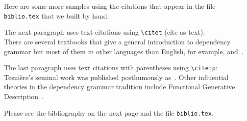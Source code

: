 Here are some more samples using the citations that appear in the file
\verb+biblio.tex+ that we built by hand.

The next paragraph uses text citations using \verb+\citet+ (cite as text):\\
\noindent
There are several textbooks that give a general 
introduction to dependency grammar but
most of them in other languages than English, for example,
\citet{tarvainen82} and~\citet{weber-97}.

The last paragraph uses text citations with parentheses
using \verb+\citetp+:\\
\noindent
Tesni{\`e}re's seminal work was published
posthumously as~\citep{tesniere59}. 
Other influential theories in the dependency
grammar tradition include Functional Generative
Description~\citep{SHP:1986}.

Please see the bibliography on the next page and the file \verb+biblio.tex+.
